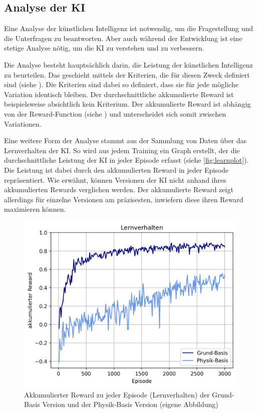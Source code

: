 \subsection{Analyse der KI}\label{sub:d_reflex_analys}
Eine Analyse der künstlichen Intelligenz ist notwendig, um die Fragestellung und die
Unterfragen zu beantworten. Aber auch während der Entwicklung ist eine
stetige Analyse nötig, um die KI zu verstehen und zu verbessern.
 
Die Analyse besteht hauptsächlich darin, die Leistung der künstlichen
Intelligenz zu beurteilen. Das geschieht mittels der Kriterien, die für diesen
Zweck definiert sind (siehe ). Die Kriterien sind dabei so
definiert, dass sie für jede mögliche Variation identisch bleiben. Der
durchschnittliche akkumulierte Reward ist beispielsweise absichtlich kein
Kriterium. Der akkumulierte Reward ist abhängig von der Reward-Function (siehe
) und unterscheidet sich somit zwischen Variationen.
 
Eine weitere Form der Analyse stammt aus der Sammlung von Daten über das
Lernverhalten der KI. So wird aus jedem Training ein Graph erstellt, der die
durchschnittliche Leistung der KI in jeder Episode erfasst (siehe
\autoref{fig:learnplot}). Die Leistung ist dabei durch den akkumulierten Reward
in jeder Episode repräsentiert. Wie erwähnt, können Versionen der KI nicht anhand
ihres akkumulierten Rewards verglichen werden. Der akkumulierte Reward zeigt
allerdings für einzelne Versionen am präzisesten, inwiefern diese ihren Reward
maximieren können.

\newpage 
\begin{figure}[!ht]
   \centering
   \includegraphics[width=\textwidth-2cm]{images/diskussion/learnplot.png}
   \caption{Akkumulierter Reward zu jeder Episode (Lernverhalten) der Grund-Basis Version und der Physik-Basis Version (eigene Abbildung)}\label{fig:learnplot}
\end{figure}
 
